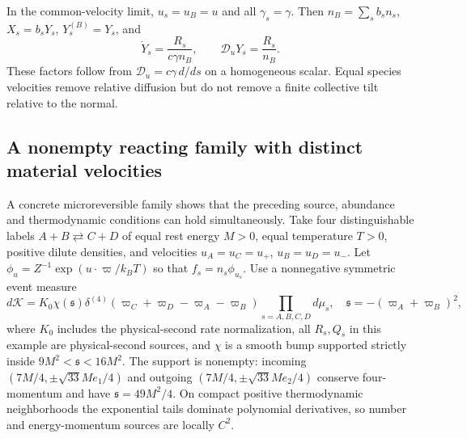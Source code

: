 In the common-velocity limit, $u_s=u_B=u$ and all $\gamma_s=\gamma$. Then $n_B=\sum_sb_sn_s$, $X_s=b_sY_s$, $Y_s^{(B)}=Y_s$, and
\begin{equation}
 \dot Y_s=\frac{R_s}{c\gamma n_B},\qquad
 \mathscr D_uY_s=\frac{R_s}{n_B}.
 \label{ii:common_velocity_abundance}
\end{equation}
These factors follow from $\mathscr D_u=c\gamma\,d/ds$ on a homogeneous scalar. Equal species velocities remove relative diffusion but do not remove a finite collective tilt relative to the normal.

\subsection{A nonempty reacting family with distinct material velocities}
\label{ii:reacting_family}
A concrete microreversible family shows that the preceding source, abundance and thermodynamic conditions can hold simultaneously. Take four distinguishable labels $A+B\rightleftarrows C+D$ of equal rest energy $M>0$, equal temperature $T>0$, positive dilute densities, and velocities $u_A=u_C=u_+$, $u_B=u_D=u_-$. Let $\phi_u=Z^{-1}\exp(u\cdot\varpi/k_BT)$ so that $f_s=n_s\phi_{u_s}$. Use a nonnegative symmetric event measure
\begin{equation}
 d\mathcal K=K_0\chi(\mathfrak s)\delta^{(4)}(\varpi_C+\varpi_D-\varpi_A-\varpi_B)
 \prod_{s=A,B,C,D}d\mu_s,\quad
 \mathfrak s=-(\varpi_A+\varpi_B)^2,
 \label{ii:reaction_measure}
\end{equation}
where $K_0$ includes the physical-second rate normalization, all $R_s,Q_s$ in this example are physical-second sources, and $\chi$ is a smooth bump supported strictly inside $9M^2<\mathfrak s<16M^2$. The support is nonempty: incoming $(7M/4,\pm\sqrt{33}M e_1/4)$ and outgoing $(7M/4,\pm\sqrt{33}M e_2/4)$ conserve four-momentum and have $\mathfrak s=49M^2/4$. On compact positive thermodynamic neighborhoods the exponential tails dominate polynomial derivatives, so number and energy-momentum sources are locally $C^2$.

